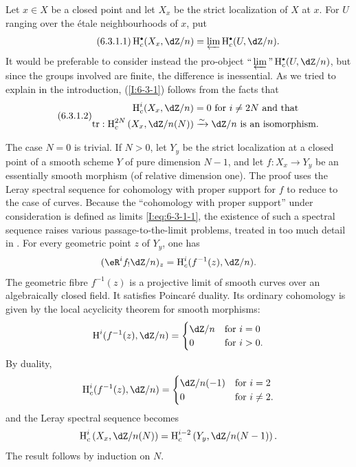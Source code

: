 Let $x\in X$ be a closed point and let $X_x$ be the strict localization
of $X$ at $x$. For $U$ ranging over the étale neighbourhoods of $x$,
put
\begin{equation*}\tag{6.3.1.1}\label{I:eq:6-3-1-1}
  \h_c^\bullet(X_x,\dZ/n) = \varprojlim \h_c^\bullet(U,\dZ/n) \text{.}
\end{equation*}
It would be preferable to consider instead the pro-object
$\text{“}\varprojlim\text{”}\h_c^\bullet(U,\dZ/n)$, but since the
groups involved are finite, the difference is inessential. As we tried
to explain in the introduction, (\ref{I:6-3-1}) follows from the facts
that
\begin{equation*}\tag{6.3.1.2}\label{I:eq:6-3-1-2}
\begin{aligned}
  \h_c^i(X_x,\dZ/n) &= 0 \text{ for $i\ne 2N$ and that } \\
  \tr : \h_c^{2 N}\left(X_x,  \dZ/n(N)\right) &\iso \dZ/n \text{ is an isomorphism.}
\end{aligned}
\end{equation*}

The case $N=0$ is trivial. If $N>0$, let $Y_y$ be the strict
localization at a closed point of a smooth scheme $Y$ of pure dimension
$N-1$, and let $f:X_x\to Y_y$ be an essentially smooth morphism (of
relative dimension one). The proof uses the Leray spectral sequence for
cohomology with proper support for $f$ to reduce to the case of curves.
Because the “cohomology with proper support” under consideration is
defined as limits \eqref{I:eq:6-3-1-1}, the existence of such a spectral
sequence raises various passage-to-the-limit problems, treated in too much
detail in \cite[XVIII]{sga4}. For every geometric point $z$ of $Y_y$,
one has
\[
  (\eR^if_! \dZ/n)_z = \h_c^i(f^{-1}(z),\dZ/n) \text{.}
\]
The geometric fibre $f^{-1}(z)$ is a projective limit of smooth curves
over an algebraically closed field. It satisfies Poincaré duality. Its
ordinary cohomology is given by the local acyclicity theorem for smooth
morphisms:
\[
  \h^i(f^{-1}(z),\dZ/n)
    = \begin{cases}
        \dZ/n & \text{for $i=0$} \\
        0     & \text{for $i>0$.}
      \end{cases}
\]
By duality,
\[
  \h_c^i(f^{-1}(z),\dZ/n)
    = \begin{cases}
        \dZ/n(-1) & \text{for $i=2$} \\
        0         & \text{for $i\ne 2$.}
      \end{cases}
\]
and the Leray spectral sequence becomes
\[
  \h_c^i\left(X_x,\dZ/n(N)\right) = \h_c^{i-2}\left(Y_y,\dZ/n(N-1)\right) \text{.}
\]
The result follows by induction on $N$.

